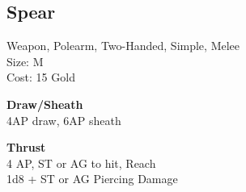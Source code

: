\subsection{Spear}\label{weapon:spear}
Weapon, Polearm, Two-Handed, Simple, Melee\\
Size: M\\
Cost: 15 Gold

\textbf{Draw/Sheath}\\
4AP draw, 6AP sheath

\textbf{Thrust}\\
4 AP, ST or AG to hit,  Reach\\
1d8 + \texttimes ST or AG Piercing Damage

